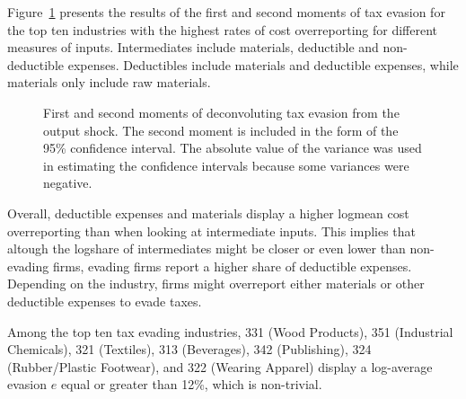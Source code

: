 \documentclass[
  12pt]{article}
\theoremstyle{definition}
\theoremstyle{remark}
\begin{document}
Figure~\ref{fig-deconv-mmt} presents the results of the first and second
moments of tax evasion for the top ten industries with the highest rates
of cost overreporting for different measures of inputs. Intermediates
include materials, deductible and non-deductible expenses. Deductibles
include materials and deductible expenses, while materials only include
raw materials.

\begin{figure}


\caption{\label{fig-deconv-mmt}First and second moments of deconvoluting
tax evasion from the output shock. The second moment is included in the
form of the 95\% confidence interval. The absolute value of the variance
was used in estimating the confidence intervals because some variances
were negative.}

\end{figure}%

Overall, deductible expenses and materials display a higher logmean cost
overreporting than when looking at intermediate inputs. This implies
that altough the logshare of intermediates might be closer or even lower
than non-evading firms, evading firms report a higher share of
deductible expenses. Depending on the industry, firms might overreport
either materials or other deductible expenses to evade taxes.

Among the top ten tax evading industries, 331 (Wood Products), 351
(Industrial Chemicals), 321 (Textiles), 313 (Beverages), 342
(Publishing), 324 (Rubber/Plastic Footwear), and 322 (Wearing Apparel)
display a log-average evasion \(e\) equal or greater than 12\%, which is
non-trivial.
\end{document}
